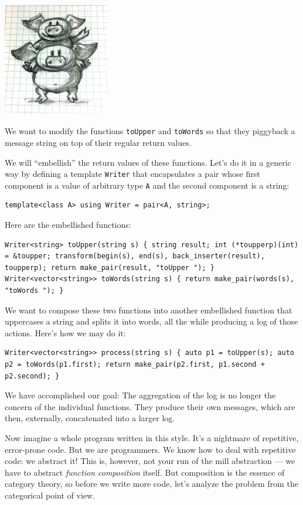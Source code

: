 \includegraphics[width=1.83333in]{images/piggyback.jpg}

We want to modify the functions \texttt{toUpper} and \texttt{toWords} so
that they piggyback a message string on top of their regular return
values.

We will ``embellish'' the return values of these functions. Let's do it
in a generic way by defining a template \texttt{Writer} that
encapsulates a pair whose first component is a value of arbitrary type
\texttt{A} and the second component is a string:

\begin{verbatim}
template<class A> using Writer = pair<A, string>;
\end{verbatim}

Here are the embellished functions:

\begin{verbatim}
Writer<string> toUpper(string s) { string result; int (*toupperp)(int) = &toupper; transform(begin(s), end(s), back_inserter(result), toupperp); return make_pair(result, "toUpper "); } Writer<vector<string>> toWords(string s) { return make_pair(words(s), "toWords "); }
\end{verbatim}

We want to compose these two functions into another embellished function
that uppercases a string and splits it into words, all the while
producing a log of those actions. Here's how we may do it:

\begin{verbatim}
Writer<vector<string>> process(string s) { auto p1 = toUpper(s); auto p2 = toWords(p1.first); return make_pair(p2.first, p1.second + p2.second); }
\end{verbatim}

We have accomplished our goal: The aggregation of the log is no longer
the concern of the individual functions. They produce their own
messages, which are then, externally, concatenated into a larger log.

Now imagine a whole program written in this style. It's a nightmare of
repetitive, error-prone code. But we are programmers. We know how to
deal with repetitive code: we abstract it! This is, however, not your
run of the mill abstraction --- we have to abstract \emph{function
composition} itself. But composition is the essence of category theory,
so before we write more code, let's analyze the problem from the
categorical point of view.

